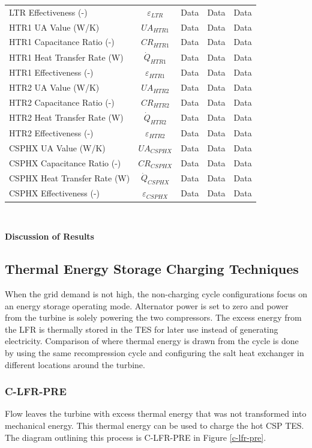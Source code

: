 \begin{paracol}{2}
\begin{specialtable}[H]
\begin{tabular}{lcccc}
    LTR Effectiveness (-)	&	$\varepsilon_{LTR}$	&	Data	&	Data	&	Data	\\
    HTR1 UA Value (W/K)	&	$UA_{HTR1}$	&	Data	&	Data	&	Data	\\
    HTR1 Capacitance Ratio (-)	&	$CR_{HTR1}$	&	Data	&	Data	&	Data	\\
    HTR1 Heat Transfer Rate (W)	&	$\dot{Q}_{HTR1}$	&	Data	&	Data	&	Data	\\
    HTR1 Effectiveness (-)	&	$\varepsilon_{HTR1}$	&	Data	&	Data	&	Data	\\
    HTR2 UA Value (W/K)	&	$UA_{HTR2}$	&	Data	&	Data	&	Data	\\
    HTR2 Capacitance Ratio (-)	&	$CR_{HTR2}$	&	Data	&	Data	&	Data	\\
    HTR2 Heat Transfer Rate (W)	&	$\dot{Q}_{HTR2}$	&	Data	&	Data	&	Data	\\
    HTR2 Effectiveness (-)	&	$\varepsilon_{HTR2}$	&	Data	&	Data	&	Data	\\
    CSPHX UA Value (W/K)	&	$UA_{CSPHX}$	&	Data	&	Data	&	Data	\\
    CSPHX Capacitance Ratio (-)	&	$CR_{CSPHX}$	&	Data	&	Data	&	Data	\\
    CSPHX Heat Transfer Rate (W)	&	$\dot{Q}_{CSPHX}$	&	Data	&	Data	&	Data	\\
    CSPHX Effectiveness (-)	&	$\varepsilon_{CSPHX}$	&	Data	&	Data	&	Data	\\
    \bottomrule
    \end{tabular}\\
\end{specialtable}

\textbf{Discussion of Results}

\subsection{Thermal Energy Storage Charging Techniques} %

When the grid demand is not high, the non-charging cycle configurations focus on an energy storage operating mode. Alternator power is set to zero and power from the turbine is solely powering the two compressors. The excess energy from the LFR is thermally stored in the TES for later use instead of generating electricity. Comparison of where thermal energy is drawn from the cycle is done by using the same recompression cycle and configuring the salt heat exchanger in different locations around the turbine. 

\subsubsection{C-LFR-PRE} %

Flow leaves the turbine with excess thermal energy that was not transformed into mechanical energy. This thermal energy can be used to charge the hot CSP TES. The diagram outlining this process is C-LFR-PRE in Figure \ref{c-lfr-pre}.  

\end{paracol}
